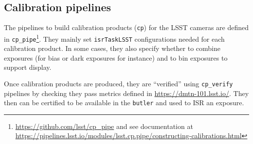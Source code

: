 \subsection{Calibration pipelines}
\label{sec:calib_pipe}

The pipelines to build calibration products (\texttt{cp}) for the LSST cameras are defined in \texttt{cp\_pipe}\footnote{\url{https://github.com/lsst/cp\_pipe} and see documentation at \url{https://pipelines.lsst.io/modules/lsst.cp.pipe/constructing-calibrations.html}}.
They mainly set \texttt{isrTaskLSST} configurations needed for each calibration product. In some cases, they also specify whether to combine exposures (for bias or dark exposures for instance) and to bin exposures to support display.

Once calibration products are produced, they are ``verified'' using \texttt{cp\_verify} pipelines by checking they pass metrics defined in \url{https://dmtn-101.lsst.io/}. They then can be certified to be available in the \texttt{butler} and used to ISR an exposure.  

